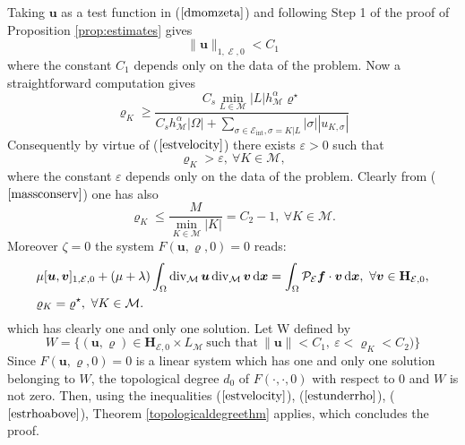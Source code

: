 \documentclass{amsart}
\numberwithin{equation}{section}
\begin{document}
Taking ${{\boldsymbol u}} $ as a test function in ($\ref{dmomzeta}$) and following Step 1 of the proof of Proposition \ref{prop:estimates} gives
\begin{equation}\label{estvelocity}
 \| {\bm{u}} \|_{1,\operatorname{{\mathcal{E}}},0} < C_1
\end{equation}
where the constant $C_1$ depends only on the data of the problem. Now a straightforward computation gives
\begin{equation*}
{\varrho}_K \ge \frac{ {C_s} \min_{L \in {{\mathcal M}}} |L| h_{{\mathcal M}}^\alpha {\varrho}^\star}{{C_s} h_{{\mathcal M}}^\alpha |\Omega| + {\sum_{{{\sigma}} \in {\mathcal{E}}_\operatorname{int},{{\sigma}}=K|L} } |{{\sigma}}||u_{K,{{\sigma}}} |  }
\end{equation*}
Consequently by virtue of  ($\ref{estvelocity}$) there exists $\varepsilon > 0 $ such that 
\begin{equation}\label{estunderrho}
{\varrho}_K > \varepsilon, \ \forall K \in {{\mathcal M}},
\end{equation}
where the constant $\varepsilon$ depends only on the data of the problem. Clearly from ($\ref{massconserv}$) one has also
\begin{equation}\label{estrhoabove}
{\varrho}_K \le \frac{M}{ \min_{K \in {{\mathcal M}}} |K|}=C_2-1, \ \forall K \in {{\mathcal M}}.
\end{equation}
Moreover $ \zeta = 0 $ the system $F({{\boldsymbol u}},{\varrho},0) = 0 $ reads:
  \begin{subequations}\label{weak:ro0}
  \begin{align} 
      &  \mu [{{\boldsymbol u}},{{\boldsymbol v}}]_{1,{{\mathcal E}},0} + (\mu+\lambda)\int_\Omega \operatorname{div}_{{\mathcal M}} {{\boldsymbol u}} \operatorname{div}_{{\mathcal M}} {{\boldsymbol v}} {\, {\rm d}{{\boldsymbol x}}}  = \int_\Omega \mathcal P_{{\mathcal E}} {{\boldsymbol f}} \cdot {{\boldsymbol v}} {\, {\rm d}{{\boldsymbol x}}}, \ \forall {\bm{v}} \in {{\mathbf{H}_{{{\mathcal E}},0}}}, \label{dmomzeta0}
      \\  
      &  {\varrho}_K ={\varrho}^\star, \ \forall K \in {{\mathcal M}}. \label{dcontzeta0}
    \end{align}
  \end{subequations}
which has clearly one and only one solution.
Let W defined by
\begin{equation*}
W = \{ ({{\boldsymbol u}},{\varrho}) \in {{\mathbf{H}_{{{\mathcal E}},0}}} \times L_{{\mathcal M}} \ \text{such that} \ \| {{\boldsymbol u}} \| < C_1, \ \varepsilon < {\varrho}_K < C_2) \}
\end{equation*}
Since $F({{\boldsymbol u}},{\varrho},0) = 0 $ is a linear system which has one and only one  solution belonging to $W$, the topological degree $d_0$ of $F (\cdot, \cdot, 0)$ with respect to 0 and $W$ is not zero. Then, using the inequalities  ($\ref{estvelocity}$), ($\ref{estunderrho}$), ($\ref{estrhoabove}$), Theorem \ref{topologicaldegreethm} applies, which concludes the proof.



\end{document}
